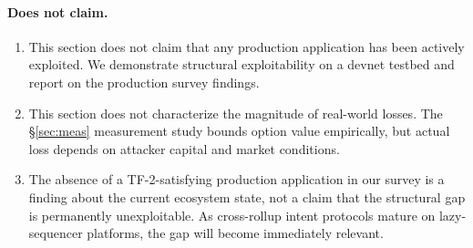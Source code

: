 \paragraph{Does not claim.}
\begin{enumerate}
  \item This section does not claim that any production application has been
    actively exploited. We demonstrate structural exploitability on a devnet
    testbed and report on the production survey findings.
  \item This section does not characterize the magnitude of real-world losses.
    The \S\ref{sec:meas} measurement study bounds option value empirically,
    but actual loss depends on attacker capital and market conditions.
  \item The absence of a TF-2-satisfying production application in our survey
    is a finding about the current ecosystem state, not a claim that the
    structural gap is permanently unexploitable. As cross-rollup intent
    protocols mature on lazy-sequencer platforms, the gap will become
    immediately relevant.
\end{enumerate}
